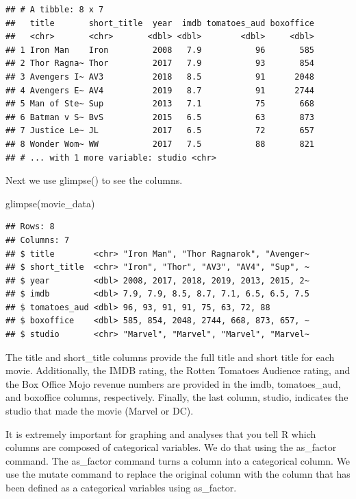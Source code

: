 \documentclass[
]{krantz}
\makeatletter
\newenvironment{Shaded}{\begin{snugshade}}{\end{snugshade}}
\newcommand{\FunctionTok}[1]{\textcolor[rgb]{0,0,0}{#1}}
\newcommand{\NormalTok}[1]{#1}
\newenvironment{kframe}{%
\medskip{}
\setlength{\fboxsep}{.8em}
 \def\at@end@of@kframe{}%
 \ifinner\ifhmode%
  \def\at@end@of@kframe{\end{minipage}}%
  \begin{minipage}{\columnwidth}%
 \fi\fi%
 \def\FrameCommand##1{\hskip\@totalleftmargin \hskip-\fboxsep
 \colorbox{shadecolor}{##1}\hskip-\fboxsep
     \hskip-\linewidth \hskip-\@totalleftmargin \hskip\columnwidth}%
 \MakeFramed {\advance\hsize-\width
   \@totalleftmargin\z@ \linewidth\hsize
   \@setminipage}}%
 {\par\unskip\endMakeFramed%
 \at@end@of@kframe}
\renewenvironment{Shaded}{\begin{kframe}}{\end{kframe}}
\makeatother
\begin{document}
\begin{verbatim}
## # A tibble: 8 x 7
##   title       short_title  year  imdb tomatoes_aud boxoffice
##   <chr>       <chr>       <dbl> <dbl>        <dbl>     <dbl>
## 1 Iron Man    Iron         2008   7.9           96       585
## 2 Thor Ragna~ Thor         2017   7.9           93       854
## 3 Avengers I~ AV3          2018   8.5           91      2048
## 4 Avengers E~ AV4          2019   8.7           91      2744
## 5 Man of Ste~ Sup          2013   7.1           75       668
## 6 Batman v S~ BvS          2015   6.5           63       873
## 7 Justice Le~ JL           2017   6.5           72       657
## 8 Wonder Wom~ WW           2017   7.5           88       821
## # ... with 1 more variable: studio <chr>
\end{verbatim}

Next we use glimpse() to see the columns.

\begin{Shaded}
\begin{Highlighting}[]
\FunctionTok{glimpse}\NormalTok{(movie\_data)}
\end{Highlighting}
\end{Shaded}

\begin{verbatim}
## Rows: 8
## Columns: 7
## $ title        <chr> "Iron Man", "Thor Ragnarok", "Avenger~
## $ short_title  <chr> "Iron", "Thor", "AV3", "AV4", "Sup", ~
## $ year         <dbl> 2008, 2017, 2018, 2019, 2013, 2015, 2~
## $ imdb         <dbl> 7.9, 7.9, 8.5, 8.7, 7.1, 6.5, 6.5, 7.5
## $ tomatoes_aud <dbl> 96, 93, 91, 91, 75, 63, 72, 88
## $ boxoffice    <dbl> 585, 854, 2048, 2744, 668, 873, 657, ~
## $ studio       <chr> "Marvel", "Marvel", "Marvel", "Marvel~
\end{verbatim}

The title and short\_title columns provide the full title and short title for each movie. Additionally, the IMDB rating, the Rotten Tomatoes Audience rating, and the Box Office Mojo revenue numbers are provided in the imdb, tomatoes\_aud, and boxoffice columns, respectively. Finally, the last column, studio, indicates the studio that made the movie (Marvel or DC).

It is extremely important for graphing and analyses that you tell R which columns are composed of categorical variables. We do that using the as\_factor command. The as\_factor command turns a column into a categorical column. We use the mutate command to replace the original column with the column that has been defined as a categorical variables using as\_factor.
\end{document}
